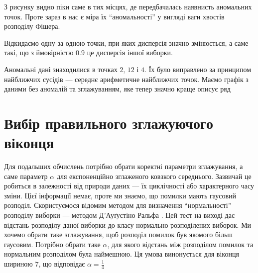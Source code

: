 З рисунку видно піки саме в тих місцях,
де передбачалась наявнисть аномальних точок.
Проте зараз в нас є міра їх ``аномальності''
у вигляді ваги хвостів розподілу Фішера.
\begin{center}
\end{center}

Відкидаємо одну за одною точки, при яких дисперсія значно змінюється,
а саме такі, що з ймовірністю $0.9$ це дисперсія іншої виборки.

\begin{center}
\end{center}

\begin{center}
\end{center}

\begin{center}
\end{center}

\begin{center}
\end{center}

Аномальні дані знаходилися в точках $2$, $12$ і $4$.
Їх було виправлено за принципом найближчих сусідів ---
середнє арифметичне найближчих точок.
Маємо графік з даними без аномалій та зглажуванням,
яке тепер значно краще описує ряд

\begin{center}
\end{center}

\section{Вибір правильного зглажуючого віконця}

Для подальших обчислень потрібно обрати коректні параметри зглажування,
а саме параметр $\alpha$ для експоненційно зглаженого ковзкого середнього.
Зазвичай це робиться в залежності від природи даних ---
їх циклічності або характерного часу зміни.
Цієї інформації немає, проте ми знаємо, що помилки мають гаусовий розподіл.
Скористуємося відомим методом
для визначення ``нормальності'' розподілу виборки ---
методом Д'Ауґустіно Ральфа \cite{dago1990}.
Цей тест на виході дає відстань розподілу даної виборки
до класу нормально розподілених виборок.
Ми хочемо обрати таке зглажування,
щоб розподіл помилок був якомого більш гаусовим.
Потрібно обрати таке $\alpha$,
для якого відстань між розподілом помилок та нормальним розподілом
була наймешною.
Ця умова винонується для віконця шириною $7$,
що відповідає $\alpha = \frac{1}{4}$

\begin{center}
\end{center}

